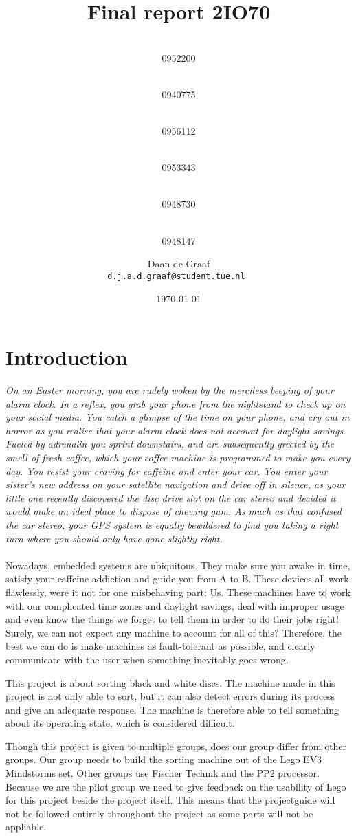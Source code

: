 \documentclass[a4paper,oneside,11pt]{report}
\title{\vspace{-\baselineskip}\sffamily\bfseries \Huge{ Final report 2IO70}}
\author{
	\makebox[.25\linewidth]{Sergio van Amerongen}\\0952200 \and
	\makebox[.25\linewidth]{Stefan Cloudt}\\0940775 \and
	\makebox[.25\linewidth]{Daan de Graaf}\\0956112 \and
	\makebox[.25\linewidth]{Robert van Lente}\\0953343 \and
	\makebox[.25\linewidth]{Tom Peters}\\0948730 \and
	\makebox[.25\linewidth]{Berrie Trippe}\\0948147 
	\and \makebox[.75\linewidth]{\textbf{Responsible:}} \and
	Daan de Graaf\\ \tt{d.j.a.d.graaf@student.tue.nl}
}
\date{\today}
\begin{document}
\maketitle

\tableofcontents

\chapter{Introduction}
\textit{
On an Easter morning, you are rudely woken by the merciless beeping of your alarm clock. In a reflex, you grab your phone from the nightstand to check up on your social media. You catch a glimpse of the time on your phone, and cry out in horror as you realise that your alarm clock does not account for daylight savings. Fueled by adrenalin you sprint downstairs, and are subsequently greeted by the smell of fresh coffee, which your coffee machine is programmed to make you every day. You resist your craving for caffeine and enter your car. You enter your sister's new address on your satellite navigation and drive off in silence, as your little one recently discovered the disc drive slot on the car stereo and decided it would make an ideal place to dispose of chewing gum. As much as that confused the car stereo, your GPS system is equally bewildered to find you taking a right turn where you should only have gone slightly right.
}
\\\\
Nowadays, embedded systems are ubiquitous. They make sure you awake in time, satisfy your caffeine addiction and guide you from A to B. These devices all work flawlessly, were it not for one misbehaving part: Us. These machines have to work with our complicated time zones and daylight savings, deal with improper usage and even know the things we forget to tell them in order to do their jobs right! Surely, we can not expect any machine to account for all of this? Therefore, the best we can do is make machines as fault-tolerant as possible, and clearly communicate with the user when something inevitably goes wrong.

This project is about sorting black and white discs. The machine made in this project is not only able to sort, but it can also detect errors during its process and give an adequate response. The machine is therefore able to tell something about its operating state, which is considered difficult.

Though this project is given to multiple groups, does our group differ from other groups. Our group needs to build the sorting machine out of the Lego EV3 Mindstorms set. Other groups use Fischer Technik and the PP2 processor. Because we are the pilot group we need to give feedback on the usability of Lego for this project beside the project itself. This means that the projectguide will not be followed entirely throughout the project as some parts will not be appliable.
\end{document}
